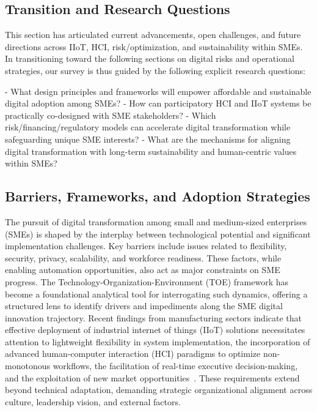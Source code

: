 \documentclass[sigconf]{acmart}
\begin{document}
\subsection{Transition and Research Questions}

This section has articulated current advancements, open challenges, and future directions across IIoT, HCI, risk/optimization, and sustainability within SMEs. In transitioning toward the following sections on digital risks and operational strategies, our survey is thus guided by the following explicit research questions:

- What design principles and frameworks will empower affordable and sustainable digital adoption among SMEs?
- How can participatory HCI and IIoT systems be practically co-designed with SME stakeholders?
- Which risk/financing/regulatory models can accelerate digital transformation while safeguarding unique SME interests?
- What are the mechanisms for aligning digital transformation with long-term sustainability and human-centric values within SMEs?

\subsection{Barriers, Frameworks, and Adoption Strategies}

The pursuit of digital transformation among small and medium-sized enterprises (SMEs) is shaped by the interplay between technological potential and significant implementation challenges. Key barriers include issues related to flexibility, security, privacy, scalability, and workforce readiness. These factors, while enabling automation opportunities, also act as major constraints on SME progress. The Technology-Organization-Environment (TOE) framework has become a foundational analytical tool for interrogating such dynamics, offering a structured lens to identify drivers and impediments along the SME digital innovation trajectory. Recent findings from manufacturing sectors indicate that effective deployment of industrial internet of things (IIoT) solutions necessitates attention to lightweight flexibility in system implementation, the incorporation of advanced human-computer interaction (HCI) paradigms to optimize non-monotonous workflows, the facilitation of real-time executive decision-making, and the exploitation of new market opportunities~\cite{ref89}. These requirements extend beyond technical adaptation, demanding strategic organizational alignment across culture, leadership vision, and external factors.
\end{document}
